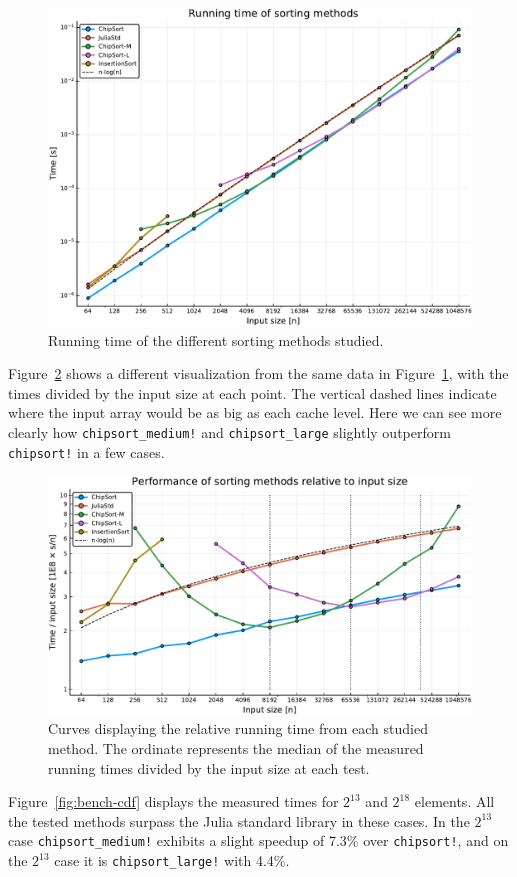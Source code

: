 \documentclass{juliacon}
\begin{document}
\begin{figure}[htb]
\centerline{\includegraphics[width=0.9\linewidth]{fig/chipsort-bench-time.pdf}}
\caption{Running time of the different sorting methods studied.}
\label{fig:bench-time}
\end{figure}

Figure~\ref{fig:bench-curves} shows a different visualization from the same data in Figure~\ref{fig:bench-time}, with the times divided by the input size at each point. The vertical dashed lines indicate where the input array would be as big as each cache level. Here we can see more clearly how {\tt chipsort\_medium!} and {\tt chipsort\_large} slightly outperform {\tt chipsort!} in a few cases.

\begin{figure}[thb]
\centerline{\includegraphics[width=0.7\linewidth]{fig/chipsort-bench-curves.pdf}}
\caption{Curves displaying the relative running time from each studied method. The ordinate represents the median of the measured running times divided by the input size at each test.}
\label{fig:bench-curves}
\end{figure}

Figure~\ref{fig:bench-cdf} displays the measured times for $2^{13}$ and $2^{18}$ elements. All the tested \chipsort methods surpass the Julia standard library in these cases. In the $2^{13}$ case {\tt chipsort\_medium!} exhibits a slight speedup of 7.3\% over {\tt chipsort!}, and on the $2^{13}$ case it is {\tt chipsort\_large!} with 4.4\%.
\end{document}
